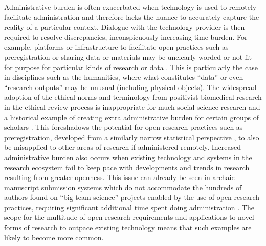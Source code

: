 \documentclass[ authordate, meta, issue]{jote-new-article}
\begin{document}
Administrative burden is often exacerbated when technology is used to remotely facilitate administration and therefore lacks the nuance to accurately capture the reality of a particular context. Dialogue with the technology provider is then required to resolve discrepancies, inconspicuously increasing time burden. For example, platforms or infrastructure to facilitate open practices such as preregistration or sharing data or materials may be unclearly worded or not fit for purpose for particular kinds of research or data \parencites[e.g.][]{Borgerud2020}{RhysEvans2021}. This is particularly the case in disciplines such as the humanities, where what constitutes “data” or even “research outputs” may be unusual (including physical objects). The widespread adoption of the ethical norms and terminology from positivist biomedical research in the ethical review process is inappropriate for much social science research and a historical example of creating extra administrative burden for certain groups of scholars \parencites{Schneider2015}. This foreshadows the potential for open research practices such as preregistration, developed from a similarly narrow statistical perspective \parencites{Nosek2018}, to also be misapplied to other areas of research if administered remotely. Increased administrative burden also occurs when existing technology and systems in the research ecosystem fail to keep pace with developments and trends in research resulting from greater openness. This issue can already be seen in archaic manuscript submission systems which do not accommodate the hundreds of authors found on “big team science” projects enabled by the use of open research practices, requiring significant additional time spent doing administration \parencites{Forscher2022}. The scope for the multitude of open research requirements and applications to novel forms of research to outpace existing technology means that such examples are likely to become more common.
\end{document}
